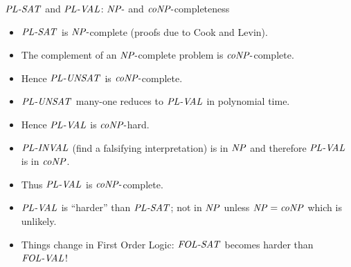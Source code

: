 \documentclass[style=sailor,size=12pt]{powerdot}
\begin{document}
\begin{wideslide}[bm=,toc=]{$\mbox{\it PL-SAT\/}$ and $\mbox{\it PL-VAL\/}$: $\mbox{\it NP-\/}$ and
  $\mbox{\it coNP-\/}$completeness}
\begin{itemize}
\item $\mbox{\it PL-SAT\/}$ is $\mbox{\it NP-\/}$complete (proofs due to Cook and Levin).
\item The complement of an $\mbox{\it NP-\/}$complete problem is $\mbox{\it coNP-\/}$complete.
\item Hence $\mbox{\it PL-UNSAT\/}$ is $\mbox{\it coNP-\/}$complete.
\item $\mbox{\it PL-UNSAT\/}$ many-one reduces to $\mbox{\it PL-VAL\/}$ in polynomial time.
\item Hence $\mbox{\it PL-VAL\/}$ is $\mbox{\it coNP-\/}$hard.
\item $\mbox{\it PL-INVAL\/}$ (find a falsifying interpretation) is in $\mbox{\it NP\/}$ and therefore $\mbox{\it PL-VAL\/}$ is in $\mbox{\it coNP\/}$.
\item Thus $\mbox{\it PL-VAL\/}$ is $\mbox{\it coNP-\/}$complete.
\item $\mbox{\it PL-VAL\/}$ is ``harder'' than $\mbox{\it PL-SAT\/}$; not in $\mbox{\it NP\/}$ unless $\mbox{\it NP\/} = \mbox{\it coNP\/}$ which is unlikely.
\item Things change in First Order Logic: $\mbox{\it FOL-SAT\/}$ becomes harder than $\mbox{\it FOL-VAL\/}$!
\end{itemize}
\end{wideslide}
\end{document}
